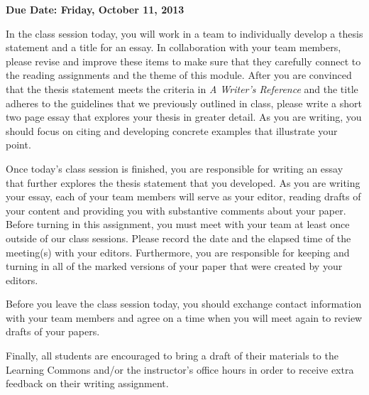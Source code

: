 

\usepackage[compact]{titlesec}



\vspace*{-.2in}
\begin{center}
	{\bf Due Date: Friday, October 11, 2013}
\end{center}

In the class session today, you will work in a team to individually develop a thesis statement and a title for an essay.
In collaboration with your team members, please revise and improve these items to make sure that they carefully connect to
the reading assignments and the theme of this module.  After you are convinced that the thesis statement meets the
criteria in {\em A Writer's Reference} and the title adheres to the guidelines that we previously outlined in class, please
write a short two page essay that explores your thesis in greater detail. As you are writing, you should focus on citing
and developing concrete examples that illustrate your point.

Once today's class session is finished, you are responsible for writing an essay that further explores the thesis
statement that you developed. As you are writing your essay, each of your team members will serve as your editor,
reading drafts of your content and providing you with substantive comments about your paper. Before turning in this
assignment, you must meet with your team at least once outside of our class sessions. Please record the date and the
elapsed time of the meeting(s) with your editors. Furthermore, you are responsible for keeping and turning in all of the
marked versions of your paper that were created by your editors.

Before you leave the class session today, you should exchange contact information with your team members and agree on a
time when you will meet again to review drafts of your papers.

Finally, all students are encouraged to bring a draft of their materials to the Learning Commons and/or the instructor's office
hours in order to receive extra feedback on their writing assignment.


